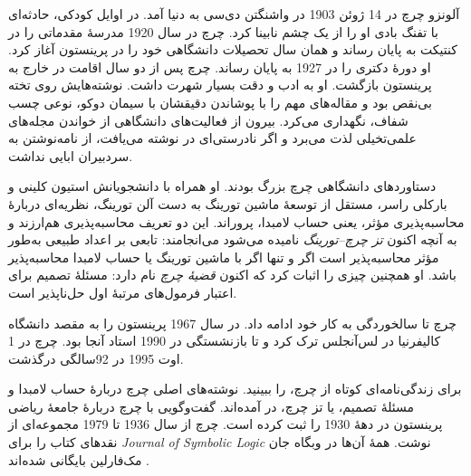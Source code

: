 \documentclass[../../../include/open-logic-section]{subfiles}
\begin{document}



آلونزو چرچ در 14 ژوئن 1903 در واشنگتن دی‌سی به دنیا آمد. در اوایل
کودکی، حادثه‌ای با تفنگ بادی او را از یک چشم نابینا کرد. چرچ در سال
1920 مدرسهٔ مقدماتی را در کنتیکت به پایان رساند و همان سال تحصیلات
دانشگاهی خود را در پرینستون آغاز کرد. او دورهٔ دکتری را در 1927 به
پایان رساند. چرچ پس از دو سال اقامت در خارج به پرینستون بازگشت. او به
ادب و دقت بسیار شهرت داشت. نوشته‌هایش روی تخته بی‌نقص بود و مقاله‌های
مهم را با پوشاندن دقیقشان با سیمان دوکو، نوعی چسب شفاف، نگهداری می‌کرد.
بیرون از فعالیت‌های دانشگاهی از خواندن مجله‌های علمی‌تخیلی لذت می‌برد
و اگر نادرستی‌ای در نوشته می‌یافت، از نامه‌نوشتن به سردبیران ابایی نداشت.

دستاوردهای دانشگاهی چرچ بزرگ بودند. او همراه با دانشجویانش استیون
کلینی و بارکلی راسر، مستقل از توسعهٔ ماشین تورینگ به دست آلن تورینگ،
نظریه‌ای دربارهٔ محاسبه‌پذیری مؤثر، یعنی حساب لامبدا، پروراند. این دو
تعریف محاسبه‌پذیری هم‌ارزند و به آنچه اکنون \emph{تز چرچ--تورینگ}
نامیده می‌شود می‌انجامند: تابعی بر اعداد طبیعی به‌طور مؤثر محاسبه‌پذیر
است اگر و تنها اگر با ماشین تورینگ یا حساب لامبدا محاسبه‌پذیر باشد.
او همچنین چیزی را اثبات کرد که اکنون \emph{قضیهٔ چرچ} نام دارد: مسئلهٔ
تصمیم برای اعتبار فرمول‌های مرتبهٔ اول حل‌ناپذیر است.

چرچ تا سالخوردگی به کار خود ادامه داد. در سال 1967 پرینستون را به مقصد
دانشگاه کالیفرنیا در لس‌آنجلس ترک کرد و تا بازنشستگی در 1990 استاد آنجا
بود. چرچ در 1 اوت 1995 در 92سالگی درگذشت.

\begin{reading}
برای زندگی‌نامه‌ای کوتاه از چرچ، \citet{EndertonND} را ببینید. نوشته‌های
اصلی چرچ دربارهٔ حساب لامبدا و مسئلهٔ تصمیم، یا تز چرچ، در
\citet{Church1936,Church1936a} آمده‌اند. \citet{Aspray1984} گفت‌وگویی
با چرچ دربارهٔ جامعهٔ ریاضی پرینستون در دههٔ 1930 را ثبت کرده است.
چرچ از سال 1936 تا 1979 مجموعه‌ای از نقدهای کتاب را برای
\emph{Journal of Symbolic Logic} نوشت. همهٔ آن‌ها در وبگاه جان
مک‌فارلین بایگانی شده‌اند \citep{MacFarlane2015}.
\end{reading}
\end{document}
